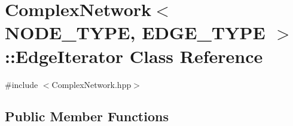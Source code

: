 \hypertarget{class_complex_network_1_1_edge_iterator}{\section{Complex\+Network$<$ N\+O\+D\+E\+\_\+\+T\+Y\+P\+E, E\+D\+G\+E\+\_\+\+T\+Y\+P\+E $>$\+:\+:Edge\+Iterator Class Reference}
\label{class_complex_network_1_1_edge_iterator}
}


{\ttfamily \#include $<$Complex\+Network.\+hpp$>$}

\subsection*{Public Member Functions}
